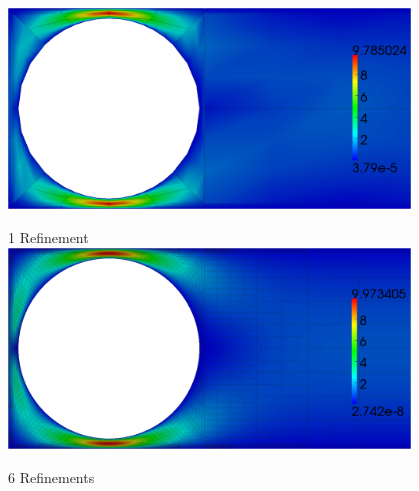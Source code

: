 \documentclass[18pt,xcolor=table]{beamer}
\begin{document}
\begin{frame}
\begin{columns}
\begin{column}{0.49\textwidth}
{\begin{figure}
{\scriptsize 6 Refinements}

Nonconservative
\end{figure}
\end{column}
\begin{column}{0.49\textwidth}
\begin{figure}
\centering
\includegraphics[width=0.95\textwidth]{StokesCylinder/umag9_C1.png}\\
\vspace{-1ex}

{\scriptsize 1 Refinement}\\
\vspace{1ex}
\includegraphics[width=0.95\textwidth]{StokesCylinder/umag9_C6.png}
\vspace{-1ex}

{\scriptsize 6 Refinements}


\end{figure}
\end{column}
\end{columns}
\end{frame}
\end{document}
